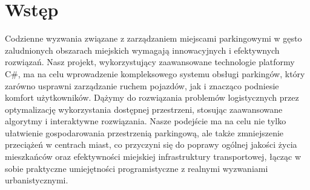 \chapter*{Wstęp}

Codzienne wyzwania związane z zarządzaniem miejscami parkingowymi w gęsto zaludnionych obszarach miejskich wymagają innowacyjnych i efektywnych rozwiązań. Nasz projekt, wykorzystujący zaawansowane technologie platformy C\#, ma na celu wprowadzenie kompleksowego systemu obsługi parkingów, który zarówno usprawni zarządzanie ruchem pojazdów, jak i znacząco podniesie komfort użytkowników. Dążymy do rozwiązania problemów logistycznych przez optymalizację wykorzystania dostępnej przestrzeni, stosując zaawansowane algorytmy i interaktywne rozwiązania. Nasze podejście ma na celu nie tylko ułatwienie gospodarowania przestrzenią parkingową, ale także zmniejszenie przeciążeń w centrach miast, co przyczyni się do poprawy ogólnej jakości życia mieszkańców oraz efektywności miejskiej infrastruktury transportowej, łącząc w sobie praktyczne umiejętności programistyczne z realnymi wyzwaniami urbanistycznymi.
